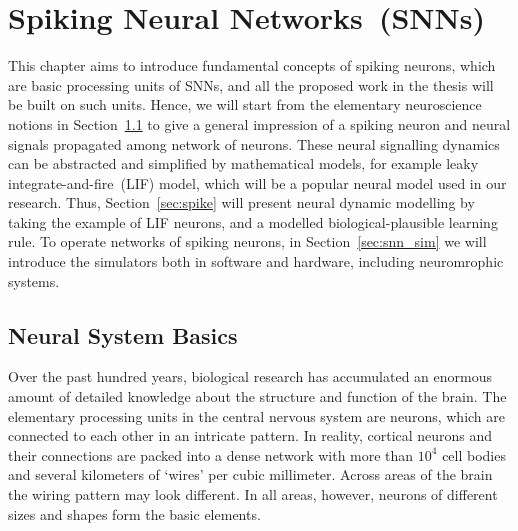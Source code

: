\chapter{Spiking Neural Networks~(SNNs)}
\label{cha:bkg}
This chapter aims to introduce fundamental concepts of spiking neurons, which are basic processing units of SNNs, and all the proposed work in the thesis will be built on such units.
Hence, we will start from the elementary neuroscience notions in Section~\ref{sec:neuron_basic} to give a general impression of a spiking neuron and neural signals propagated among network of neurons.
These neural signalling dynamics can be abstracted and simplified by mathematical models, for example leaky integrate-and-fire~(LIF) model, which will be a popular neural model used in our research.
Thus, Section~\ref{sec:spike} will present neural dynamic modelling by taking the example of LIF neurons, and a modelled biological-plausible learning rule.
To operate networks of spiking neurons, in Section~\ref{sec:snn_sim} we will introduce the simulators both in software and hardware, including neuromrophic systems.


\section{Neural System Basics}
\label{sec:neuron_basic}
Over the past hundred years, biological research has accumulated an enormous amount of detailed knowledge about the structure and function of the brain.
The elementary processing units in the central nervous system are neurons, which are connected to each other in an intricate pattern.
In reality, cortical neurons and their connections are packed into a dense network with more than $10^{4}$ cell bodies and several kilometers of ‘wires’ per cubic millimeter. Across areas of the brain the wiring pattern may look different.
In all areas, however, neurons of different sizes and shapes form the basic elements.

